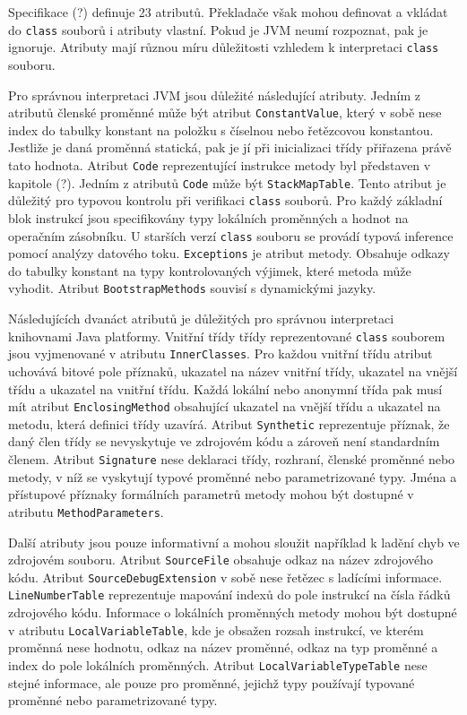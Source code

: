 
Specifikace (?) definuje 23 atributů. Překladače však mohou definovat a vkládat do \texttt{class} souborů i atributy vlastní. Pokud je JVM neumí rozpoznat, pak je ignoruje. Atributy mají různou míru důležitosti vzhledem k interpretaci \texttt{class} souboru. 

Pro správnou interpretaci JVM jsou důležité následující atributy. Jedním z atributů členské proměnné může být atribut \texttt{ConstantValue}, který v sobě nese index do tabulky konstant na položku s číselnou nebo řetězcovou konstantou. Jestliže je daná proměnná statická, pak je jí při inicializaci třídy přiřazena právě tato hodnota. Atribut \texttt{Code} reprezentující instrukce metody byl představen v kapitole (?). Jedním z atributů \texttt{Code} může být \texttt{StackMapTable}. Tento atribut je důležitý pro typovou kontrolu při verifikaci \texttt{class} souborů. Pro každý základní blok instrukcí jsou specifikovány typy lokálních proměnných a hodnot na operačním zásobníku. U starších verzí \texttt{class} souboru se provádí typová inference pomocí analýzy datového toku. \texttt{Exceptions} je atribut metody. Obsahuje odkazy do tabulky konstant na typy kontrolovaných výjimek, které metoda může vyhodit. Atribut \texttt{BootstrapMethods} souvisí s dynamickými jazyky.

Následujících dvanáct atributů je důležitých pro správnou interpretaci knihovnami Java platformy. Vnitřní třídy třídy reprezentované \texttt{class} souborem jsou vyjmenované v atributu \texttt{InnerClasses}. Pro každou vnitřní třídu atribut uchovává bitové pole příznaků, ukazatel na název vnitřní třídy, ukazatel na vnější třídu a ukazatel na vnitřní třídu. Každá lokální nebo anonymní třída pak musí mít atribut \texttt{EnclosingMethod} obsahující ukazatel na vnější třídu a ukazatel na metodu, která definici třídy uzavírá. Atribut \texttt{Synthetic} reprezentuje příznak, že daný člen třídy se nevyskytuje ve zdrojovém kódu a zároveň není standardním členem. Atribut \texttt{Signature} nese deklaraci třídy, rozhraní, členské proměnné nebo metody, v níž se vyskytují typové proměnné nebo parametrizované typy. Jména a přístupové příznaky formálních parametrů metody mohou být dostupné v atributu \texttt{MethodParameters}.


Další atributy jsou pouze informativní a mohou sloužit například k ladění chyb ve zdrojovém souboru. Atribut \texttt{SourceFile} obsahuje odkaz na název zdrojového kódu. Atribut \texttt{SourceDebugExtension} v sobě nese řetězec s ladícími informace. \texttt{LineNumberTable} reprezentuje mapování indexů do pole instrukcí na čísla řádků zdrojového kódu. Informace o lokálních proměnných metody mohou být dostupné v atributu \texttt{LocalVariableTable}, kde je obsažen rozsah instrukcí, ve kterém proměnná nese hodnotu, odkaz na název proměnné, odkaz na typ proměnné a index do pole lokálních proměnných. Atribut \texttt{LocalVariableTypeTable} nese stejné informace, ale pouze pro proměnné, jejichž typy používají typované proměnné nebo parametrizované typy.



